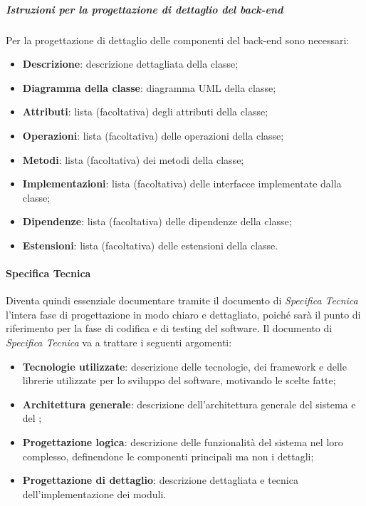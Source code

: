\subparagraph{Istruzioni per la progettazione di dettaglio del back-end}
Per la progettazione di dettaglio delle componenti del back-end sono necessari:
\begin{itemize}
    \item \textbf{Descrizione}: descrizione dettagliata della classe;
    \item \textbf{Diagramma della classe}: diagramma UML della classe;
    \item \textbf{Attributi}: lista (facoltativa) degli attributi della classe;
    \item \textbf{Operazioni}: lista (facoltativa) delle operazioni della classe;
    \item \textbf{Metodi}: lista (facoltativa) dei metodi della classe;
    \item \textbf{Implementazioni}: lista (facoltativa) delle interfacce implementate dalla classe;
    \item \textbf{Dipendenze}: lista (facoltativa) delle dipendenze della classe;
    \item \textbf{Estensioni}: lista (facoltativa) delle estensioni della classe.
\end{itemize}

\paragraph{Specifica Tecnica}
Diventa quindi essenziale documentare tramite il documento di \textit{Specifica Tecnica} l'intera fase di progettazione in modo chiaro e dettagliato, poiché sarà il punto di riferimento per la fase di codifica e di testing del software.
Il documento di \textit{Specifica Tecnica} va a trattare i seguenti argomenti:
\begin{itemize}
    \item \textbf{Tecnologie utilizzate}: descrizione delle tecnologie, dei framework e delle librerie utilizzate per lo sviluppo del software, motivando le scelte fatte;
    \item \textbf{Architettura generale}: descrizione dell'architettura generale del sistema e del ;
    \item \textbf{Progettazione logica}: descrizione delle funzionalità del sistema nel loro complesso, definendone le componenti principali ma non i dettagli;
    \item \textbf{Progettazione di dettaglio}: descrizione dettagliata e tecnica dell'implementazione dei moduli.
\end{itemize}


